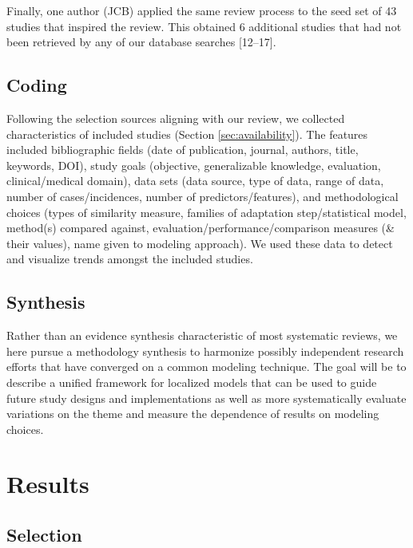 \documentclass[preprint, 3p,
authoryear]{elsarticle} %
\begin{document}
Finally, one author (JCB) applied the same review process to the seed
set of 43 studies that inspired the review. This obtained 6 additional
studies that had not been retrieved by any of our database searches
{[}12--17{]}.

\hypertarget{coding}{%
\subsection{Coding}\label{coding}}

Following the selection sources aligning with our review, we collected
characteristics of included studies (Section \ref{sec:availability}).
The features included bibliographic fields (date of publication,
journal, authors, title, keywords, DOI), study goals (objective,
generalizable knowledge, evaluation, clinical/medical domain), data sets
(data source, type of data, range of data, number of cases/incidences,
number of predictors/features), and methodological choices (types of
similarity measure, families of adaptation step/statistical model,
method(s) compared against, evaluation/performance/comparison measures
(\& their values), name given to modeling approach). We used these data
to detect and visualize trends amongst the included studies.

\hypertarget{synthesis}{%
\subsection{Synthesis}\label{synthesis}}

Rather than an evidence synthesis characteristic of most systematic
reviews, we here pursue a methodology synthesis to harmonize possibly
independent research efforts that have converged on a common modeling
technique. The goal will be to describe a unified framework for
localized models that can be used to guide future study designs and
implementations as well as more systematically evaluate variations on
the theme and measure the dependence of results on modeling choices.

\hypertarget{results}{%
\section{Results}\label{results}}

\hypertarget{selection}{%
\subsection{Selection}\label{selection}}
\end{document}
